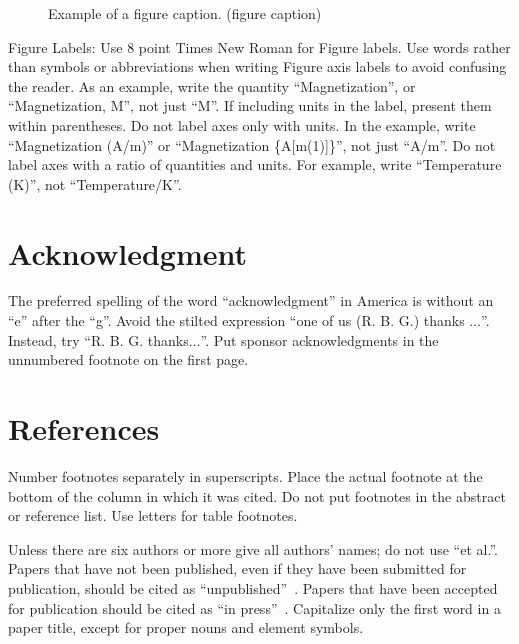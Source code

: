 \documentclass[conference, letter]{IEEEtran}
\begin{document}
\begin{figure}[thpb]
\centering
{}
\caption{Example of a figure caption. (figure caption)}
\label{figurelabel}
\end{figure}

Figure Labels: Use 8 point Times New Roman for Figure labels. Use words rather than symbols or abbreviations when writing Figure axis labels to avoid confusing the reader. As an example, write the quantity ``Magnetization'', or ``Magnetization, M'', not just ``M''. If including units in the label, present them within parentheses. Do not label axes only with units. In the example, write ``Magnetization (A/m)'' or ``Magnetization \{A[m(1)]\}'', not just ``A/m''. Do not label axes with a ratio of quantities and units. For example, write ``Temperature (K)'', not ``Temperature/K''.

\section*{Acknowledgment}

The preferred spelling of the word ``acknowledgment'' in America is without an ``e'' after the ``g''. Avoid the stilted expression ``one of us (R. B. G.) thanks $\ldots$''. Instead, try ``R. B. G. thanks$\ldots$''. Put sponsor acknowledgments in the unnumbered footnote on the first page.

\section*{References}

Number footnotes separately in superscripts. Place the actual footnote at the bottom of the column in which it was cited. Do not put footnotes in the abstract or reference list. Use letters for table footnotes.

Unless there are six authors or more give all authors' names; do not use ``et al.''. Papers that have not been published, even if they have been submitted for publication, should be cited as ``unpublished''~\cite{b4}. Papers that have been accepted for publication should be cited as ``in press''~\cite{b5}. Capitalize only the first word in a paper title, except for proper nouns and element symbols.
\end{document}
